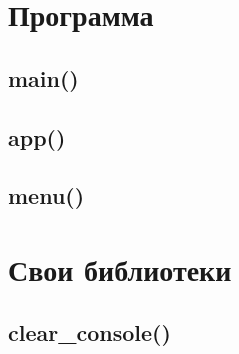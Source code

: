 \documentclass[12pt, a4paper]{article}
\begin{document}
\section{Программа}


\subsection{main()}






\subsection{app()}






\subsection{menu()}






\section{Свои библиотеки}


\subsection{clear\_console()}





\end{document}
